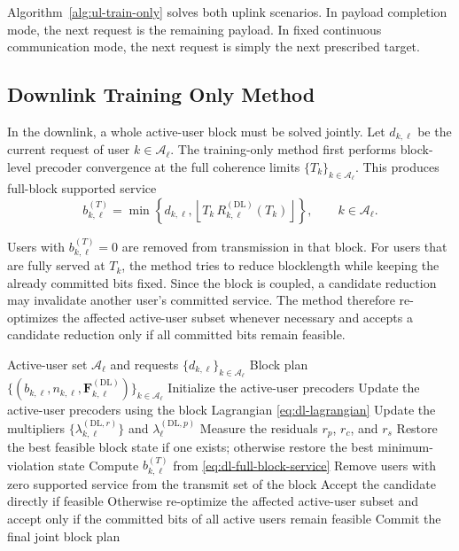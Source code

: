 \documentclass[11pt]{article}
\newcommand{\Aset}{\mathcal{A}}
\newcommand{\F}{\mathbf{F}}
\newcommand{\floor}[1]{\left\lfloor #1 \right\rfloor}
\newcommand{\DL}{\mathrm{DL}}
\begin{document}
Algorithm~\ref{alg:ul-train-only} solves both uplink scenarios. In payload
completion mode, the next request is the remaining payload. In fixed continuous
communication mode, the next request is simply the next prescribed target.

\subsection{Downlink Training Only Method}

In the downlink, a whole active-user block must be solved jointly. Let
$d_{k,\ell}$ be the current request of user $k\in\Aset_\ell$. The training-only
method first performs block-level precoder convergence at the full coherence
limits $\{T_k\}_{k\in\Aset_\ell}$. This produces full-block supported service
\begin{equation}
b_{k,\ell}^{(T)}
=
\min\!\left\{
d_{k,\ell},
\floor{T_k\,R_{k,\ell}^{(\DL)}(T_k)}
\right\},
\qquad k\in\Aset_\ell.
\label{eq:dl-full-block-service}
\end{equation}

Users with $b_{k,\ell}^{(T)}=0$ are removed from transmission in that block. For
users that are fully served at $T_k$, the method tries to reduce blocklength
while keeping the already committed bits fixed. Since the block is coupled, a
candidate reduction may invalidate another user's committed service. The method
therefore re-optimizes the affected active-user subset whenever necessary and
accepts a candidate reduction only if all committed bits remain feasible.

\begin{algorithm}[ht]
\caption{Training-Only Downlink Block Solver}
\label{alg:dl-train-only}
\begin{algorithmic}[1]
\Require Active-user set $\Aset_\ell$ and requests $\{d_{k,\ell}\}_{k\in\Aset_\ell}$
\Ensure Block plan $\{(b_{k,\ell},n_{k,\ell},\F_{k,\ell}^{(\DL)})\}_{k\in\Aset_\ell}$
\State Initialize the active-user precoders
\Repeat
    \State Update the active-user precoders using the block Lagrangian \eqref{eq:dl-lagrangian}
    \State Update the multipliers $\{\lambda_{k,\ell}^{(\DL,r)}\}$ and $\lambda_{\ell}^{(\DL,p)}$
    \State Measure the residuals $r_p$, $r_c$, and $r_s$
\State Restore the best feasible block state if one exists; otherwise restore the best minimum-violation state
\For{each active user $k\in\Aset_\ell$}
    \State Compute $b_{k,\ell}^{(T)}$ from \eqref{eq:dl-full-block-service}
\EndFor
\State Remove users with zero supported service from the transmit set of the block
        \State Accept the candidate directly if feasible
        \State Otherwise re-optimize the affected active-user subset and accept only if the committed bits of all active users remain feasible
    \EndWhile
\EndFor
\State Commit the final joint block plan
\end{algorithmic}
\end{algorithm}
\end{document}
